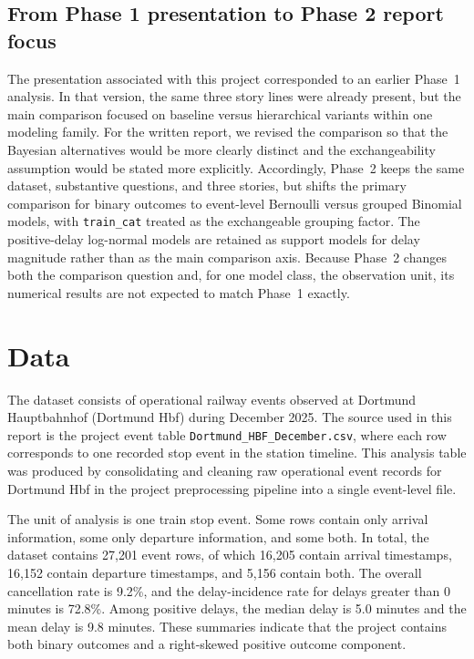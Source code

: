 \documentclass[12pt]{article}
\begin{document}
\subsection{From Phase 1 presentation to Phase 2 report focus}

The presentation associated with this project corresponded to an earlier Phase~1 analysis. In that version, the same three story lines were already present, but the main comparison focused on baseline versus hierarchical variants within one modeling family. For the written report, we revised the comparison so that the Bayesian alternatives would be more clearly distinct and the exchangeability assumption would be stated more explicitly. Accordingly, Phase~2 keeps the same dataset, substantive questions, and three stories, but shifts the primary comparison for binary outcomes to event-level Bernoulli versus grouped Binomial models, with \texttt{train\_cat} treated as the exchangeable grouping factor. The positive-delay log-normal models are retained as support models for delay magnitude rather than as the main comparison axis. Because Phase~2 changes both the comparison question and, for one model class, the observation unit, its numerical results are not expected to match Phase~1 exactly.

\section{Data}

The dataset consists of operational railway events observed at Dortmund Hauptbahnhof (Dortmund Hbf) during December 2025. The source used in this report is the project event table \texttt{Dortmund\_HBF\_December.csv}, where each row corresponds to one recorded stop event in the station timeline. This analysis table was produced by consolidating and cleaning raw operational event records for Dortmund Hbf in the project preprocessing pipeline into a single event-level file.

The unit of analysis is one train stop event. Some rows contain only arrival information, some only departure information, and some both. In total, the dataset contains 27{,}201 event rows, of which 16{,}205 contain arrival timestamps, 16{,}152 contain departure timestamps, and 5{,}156 contain both. The overall cancellation rate is 9.2\%, and the delay-incidence rate for delays greater than 0 minutes is 72.8\%. Among positive delays, the median delay is 5.0 minutes and the mean delay is 9.8 minutes. These summaries indicate that the project contains both binary outcomes and a right-skewed positive outcome component.
\end{document}

